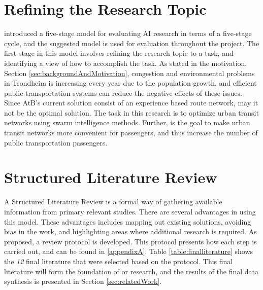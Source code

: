 \section{Refining the Research Topic}
\label{sec:definingResearchTopic}

\citet{cohen88} introduced a five-stage model for evaluating AI research in terms of a five-stage cycle, and the suggested model is used for evaluation throughout the project. The first stage in this model involves refining the research topic to a task, and identifying a view of how to accomplish the task. As stated in the motivation, Section \vref{sec:backgroundAndMotivation}, congestion and environmental problems in Trondheim is increasing every year due to the population growth, and efficient public transportation systems can reduce the negative effects of these issues. Since AtB's current solution consist of an experience based route network, may it not be the optimal solution. The task in this research is to optimize urban transit networks using swarm intelligence methods. Further, is the goal to make urban transit networks more convenient for passengers, and thus increase the number of public transportation passengers.

\section{Structured Literature Review}
\label{sec:structuredLiteratureReview}

A Structured Literature Review is a formal way of gathering available information from primary relevant studies\citep{kofod2014}. There are several advantages in using this model. These advantages includes mapping out existing solutions, avoiding bias in the work, and highlighting areas where additional research is required. As proposed, a review protocol is developed. This protocol presents how each step is carried out, and can be found in \vref{appendixA}. Table \vref{table:finalliterature} shows the \emph{\color{blue}12} final literature that were selected based on the protocol. This final literature will form the foundation of or research, and the results of the final data synthesis is presented in Section \vref{sec:relatedWork}. %


